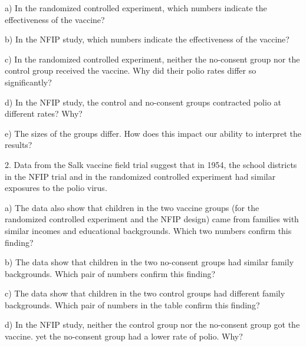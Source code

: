 \documentclass[10pt]{article}
\begin{document}
\hspace{10pt} a) In the randomized controlled experiment, which numbers indicate the effectiveness of the vaccine?
\vspace{.2in}

\hspace{10pt} b) In the NFIP study, which numbers indicate the effectiveness of the vaccine?
\vspace{.2in}

\hspace{10pt} c) In the randomized controlled experiment, neither the no-consent group nor the control group 
received the vaccine.  Why did their polio rates differ so significantly?
\vspace{.5in}

\hspace{10pt} d) In the NFIP study, the control and no-consent groups contracted polio at different rates?  Why?
\vspace{.5in}

\hspace{10pt} e) The sizes of the groups differ.  How does this impact our ability to interpret the results?
\vspace{.5in}

2. Data from the Salk vaccine field trial suggest that in 1954, the school districts in the NFIP 
trial and in the randomized controlled experiment had similar 
exposures to the polio virus.

\hspace{10pt} a) The data also show that children in the two vaccine groups (for the randomized
controlled experiment and the NFIP design) came from families with similar incomes and educational
backgrounds.  Which two numbers confirm this finding?
\vspace{.3in}

\hspace{10pt} b) The data show that children in the two no-consent groups had similar family backgrounds.
Which pair of numbers confirm this finding?
\vspace{.3in}

\hspace{10pt} c) The data show that children in the two control groups had different family
backgrounds.  Which pair of numbers in the table confirm this finding?
\vspace{.3in}

\hspace{10pt} d) In the NFIP study, neither the control group nor the no-consent group got the 
vaccine.  yet the no-consent group had a lower rate of polio.  Why?
\vspace{.5in}
\end{document}
